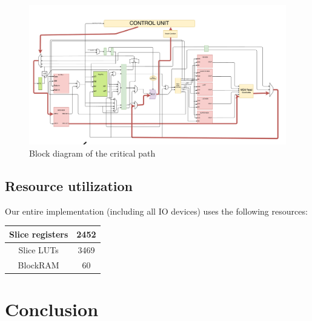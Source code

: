 \documentclass[12pt]{article}
\begin{document}
\begin{figure}[!hbtp]
\centering
\includegraphics[scale = 0.32, angle = 90]{DiagramCriticalPath.pdf}    
\caption{Block diagram of the critical path}
\label{fig:crit-path}
\end{figure}

\subsection{Resource utilization}
Our entire implementation (including all IO devices) uses the following resources:
\begin{table}[!h]
\centering
\begin{tabular}{|c|c|}
\hline
Slice registers & 2452 \\
\hline 
Slice LUTs & 3469 \\ 
\hline
BlockRAM & 60 \\
\hline
\end{tabular}
\end{table}

\section{Conclusion}
\end{document}

